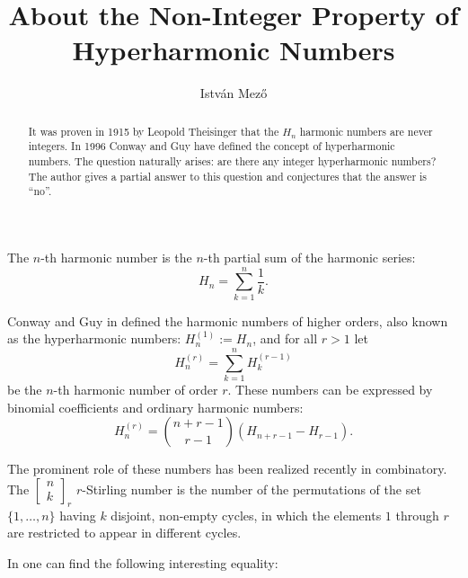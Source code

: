 \documentclass[a4paper,12pt]{amsart}
\begin{document}
\title{About the Non-Integer Property of Hyperharmonic Numbers}
\author{Istv\'an Mez\H{o}}
\address{Department of Algebra and Number Theory, Institute of Mathematics, University of Debrecen, Hungary}

 
 

\newtheorem{Theorem}{Theorem}
\newtheorem{Lemma}[Theorem]{Lemma}
\newtheorem{Corollary}[Theorem]{Corollary}
\newtheorem{Conjecture}[Theorem]{Conjecture}
\theoremstyle{definition}
\newtheorem{Example}[Theorem]{Example}
\newtheorem{Problem}[Theorem]{Problem}

\begin{abstract}It was proven in 1915 by Leopold Theisinger that the $H_n$ harmonic numbers are never integers. In 1996 Conway and Guy have defined the concept of hyperharmonic numbers. The question naturally arises: are there any integer hyperharmonic numbers? The author gives a partial answer to this question and conjectures that the answer is ``no''.
\end{abstract}

\maketitle

The $n$-th harmonic number is the $n$-th partial sum of the harmonic series:
\[H_n=\sum_{k=1}^n\frac{1}{k}.\]

Conway and Guy in \cite{CG} defined the harmonic numbers of higher orders, also known as the hyperharmonic numbers: $H_n^{(1)}:=H_n$, and for all $r>1$ let
\[H_n^{(r)}=\sum_{k=1}^n H_k^{(r-1)}\]
be the $n$-th harmonic number of order $r$.
These numbers can be expressed by binomial coefficients and ordinary harmonic numbers:
\[H_n^{(r)}=\binom{n+r-1}{r-1}(H_{n+r-1}-H_{r-1}).\]

The prominent role of these numbers has been realized recently in combinatory.
The $[\begin{smallmatrix}n\\k\end{smallmatrix}]_r$ $r$-Stirling number is the number of the permutations of the set $\{1,\dots,n\}$ having $k$ disjoint, non-empty cycles, in which the elements $1$ through $r$ are restricted to appear in different cycles.

In \cite{BGG} one can find the following interesting equality:
\end{document}
